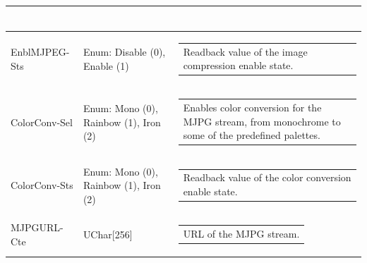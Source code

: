 \documentclass[openany]{article}
\begin{document}
\begin{longtable}{| m{3.0cm} m{4.5cm}  m{7.0cm} |}
\begin{tabular}{@{}m{6cm}@{}}
            \end{tabular} \\ \hline
        EnblMJPEG-Sts & Enum: Disable (0), Enable (1) & \begin{tabular}{@{}m{6cm}@{}}
                Readback value of the image compression enable state.
            \end{tabular} \hypertarget{pv:color-conv}{}\\ \hline
        ColorConv-Sel & Enum: Mono (0), Rainbow (1), Iron (2) & \begin{tabular}{@{}m{6cm}@{}}
                Enables color conversion for the MJPG stream, from monochrome to some of the predefined palettes.
            \end{tabular} \\ \hline
        ColorConv-Sts & Enum: Mono (0), Rainbow (1), Iron (2) & \begin{tabular}{@{}m{6cm}@{}}
                Readback value of the color conversion enable state.
            \end{tabular} \hypertarget{pv:mjpg-url}{}\\ \hline
        MJPGURL-Cte & UChar[256] & \begin{tabular}{@{}m{6cm}@{}}
                URL of the MJPG stream.
            \end{tabular} \hypertarget{}{}\\ \hline
    \end{longtable}
\end{document}
